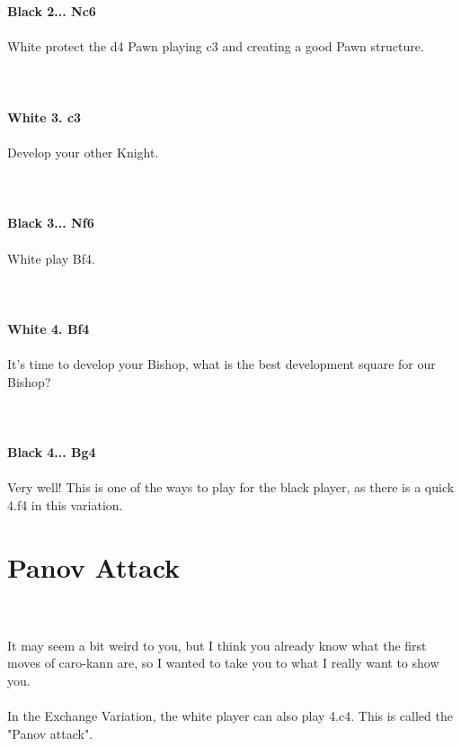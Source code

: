\documentclass{article}
\begin{document}
\\
\\
\textbf{Black 2... Nc6}\\
\\
White protect the d4 Pawn playing c3 and creating a good Pawn structure.\\
\\

\\
\\
\textbf{White 3. c3}\\
\\
Develop your other Knight. \\
\\

\\
\\
\textbf{Black 3... Nf6}\\
\\
White play Bf4.\\
\\

\\
\\
\textbf{White 4. Bf4}\\
\\
It's time to develop your Bishop, what is the best development square for our Bishop?\\
\\

\\
\\
\textbf{Black 4... Bg4}\\
\\
Very well! This is one of the ways to play for the black player, as there is a quick 4.f4 in this variation.\section{ Panov Attack}

\\
\\
It may seem a bit weird to you, but I think you already know what the first moves of caro-kann are, so I wanted to take you to what I really want to show you.\\\\In the Exchange Variation, the white player can also play 4.c4. This is called the "Panov attack".\\
\end{document}
